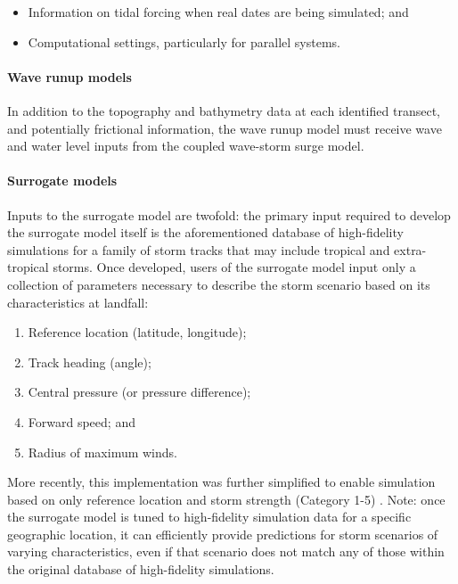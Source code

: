 \begin{itemize}
    \item Information on tidal forcing when real dates are being simulated; and
    \item Computational settings, particularly for parallel systems.
\end{itemize}

\paragraph{Wave runup models} In addition to the topography and bathymetry data at each identified transect, and potentially frictional information, the wave runup model must receive wave and water level inputs from the coupled wave-storm surge model.


\paragraph{Surrogate models} Inputs to the surrogate model are twofold: the primary input required to develop the surrogate model itself is the aforementioned database of high-fidelity simulations for a family of storm tracks that may include tropical and extra-tropical storms. Once developed, users of the surrogate model input only a collection of parameters necessary to describe the storm scenario based on its characteristics at landfall: 

\begin{enumerate}
    \item Reference location (latitude, longitude);

    \item Track heading (angle);

    \item Central pressure (or pressure difference);

    \item Forward speed; and

    \item Radius of maximum winds.
\end{enumerate}

More recently, this implementation was further simplified to enable simulation based on only reference location and storm strength (Category 1-5) \citep{njcoast2018implementation}. Note: once the surrogate model is tuned to high-fidelity simulation data for a specific geographic location, it can efficiently provide predictions for storm scenarios of varying characteristics, even if that scenario does not match any of those within the original database of high-fidelity simulations. 

